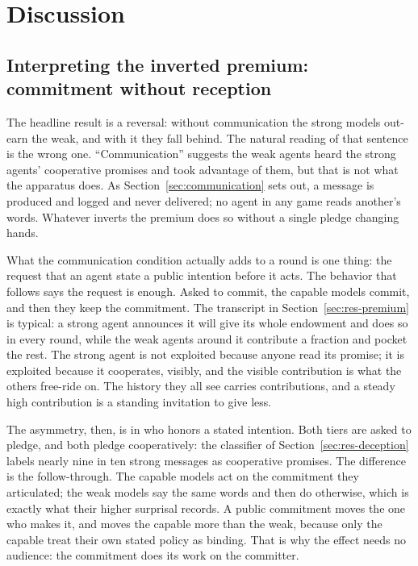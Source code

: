 \chapter{Discussion}
\label{ch:discussion}

\section{Interpreting the inverted premium: commitment without reception}
\label{sec:disc-premium}

The headline result is a reversal: without communication the strong models out-earn the
weak, and with it they fall behind. The natural reading of that sentence is the wrong one.
``Communication'' suggests the weak agents heard the strong agents' cooperative promises and
took advantage of them, but that is not what the apparatus does. As
Section~\ref{sec:communication} sets out, a message is produced and logged and never
delivered; no agent in any game reads another's words. Whatever inverts the premium does so
without a single pledge changing hands.

What the communication condition actually adds to a round is one thing: the request that an
agent state a public intention before it acts. The behavior that follows says the request is
enough. Asked to commit, the capable models commit, and then they keep the commitment. The
transcript in Section~\ref{sec:res-premium} is typical: a strong agent announces it will give
its whole endowment and does so in every round, while the weak agents around it contribute a
fraction and pocket the rest. The strong agent is not exploited because anyone read its
promise; it is exploited because it cooperates, visibly, and the visible contribution is what
the others free-ride on. The history they all see carries contributions, and a steady high
contribution is a standing invitation to give less.

The asymmetry, then, is in who honors a stated intention. Both tiers are asked to pledge, and
both pledge cooperatively: the classifier of Section~\ref{sec:res-deception} labels nearly
nine in ten strong messages as cooperative promises. The difference is the follow-through. The
capable models act on the commitment they articulated; the weak models say the same words and
then do otherwise, which is exactly what their higher surprisal records. A public commitment
moves the one who makes it, and moves the capable more than the weak, because only the capable
treat their own stated policy as binding. That is why the effect needs no audience: the
commitment does its work on the committer.

